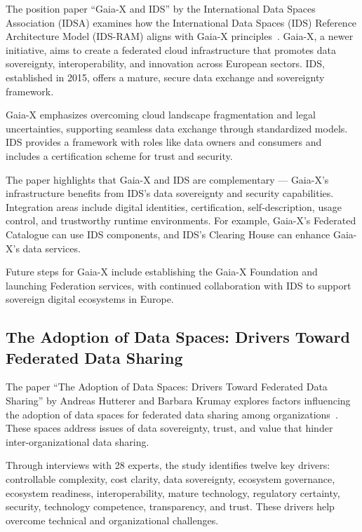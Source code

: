 The position paper ``Gaia-X and IDS'' by the International Data Spaces Association (IDSA) examines how the International Data Spaces (IDS) Reference Architecture Model (IDS-RAM) aligns with Gaia-X principles~\cite{gaiax_and_ids}.
Gaia-X, a newer initiative, aims to create a federated cloud infrastructure that promotes data sovereignty, interoperability, and innovation across European sectors.
IDS, established in 2015, offers a mature, secure data exchange and sovereignty framework.

Gaia-X emphasizes overcoming cloud landscape fragmentation and legal uncertainties, supporting seamless data exchange through standardized models.
IDS provides a framework with roles like data owners and consumers and includes a certification scheme for trust and security.

The paper highlights that Gaia-X and IDS are complementary --- Gaia-X's infrastructure benefits from IDS's data sovereignty and security capabilities.
Integration areas include digital identities, certification, self-description, usage control, and trustworthy runtime environments.
For example, Gaia-X's Federated Catalogue can use IDS components, and IDS's Clearing House can enhance Gaia-X's data services.

Future steps for Gaia-X include establishing the Gaia-X Foundation and launching Federation services, with continued collaboration with IDS to support sovereign digital ecosystems in Europe.

\subsection{The Adoption of Data Spaces: Drivers Toward Federated Data Sharing}\label{subsec:the-adoption-of-data-spaces:-drivers-toward-federated-data-sharing}

The paper ``The Adoption of Data Spaces: Drivers Toward Federated Data Sharing'' by Andreas Hutterer and Barbara Krumay explores factors influencing the adoption of data spaces for federated data sharing among organizations~\cite{adoption_of_data_spaces}.
These spaces address issues of data sovereignty, trust, and value that hinder inter-organizational data sharing.

Through interviews with 28 experts, the study identifies twelve key drivers: controllable complexity, cost clarity, data sovereignty, ecosystem governance, ecosystem readiness, interoperability, mature technology, regulatory certainty, security, technology competence, transparency, and trust.
These drivers help overcome technical and organizational challenges.

